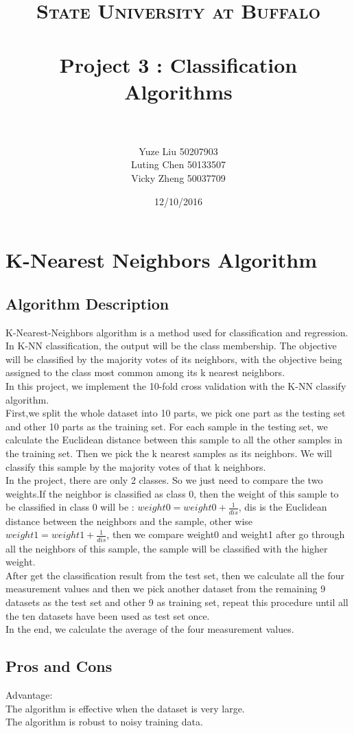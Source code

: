 \documentclass[paper=letter, fontsize=11pt]{article}
\title{
		\usefont{OT1}{bch}{b}{n}
		\normalfont \normalsize \textsc{State University at Buffalo} \\ [25pt]
		\horrule{0.5pt} \\[0.4cm]
		\Large Project 3 : Classification Algorithms \\
		\horrule{2pt} \\[0.5cm]
}
\author{
		\normalfont\large 								
        Yuze Liu \hspace{0.6cm}50207903\\
        \normalfont\large 
        Luting Chen \hspace{0.5cm}50133507\\
        \normalfont\large 
        Vicky Zheng \hspace{0.5cm}50037709\\
}
\date{\large 12/10/2016}
\numberwithin{equation}{section}		%
\numberwithin{figure}{section}			%
\numberwithin{table}{section}				%
\begin{document}
\maketitle
\section{K-Nearest Neighbors Algorithm}
\subsection{Algorithm Description}
K-Nearest-Neighbors algorithm is a method used for classification and regression. In K-NN classification, the output will be the class membership. The objective will be classified by the majority votes of its neighbors, with the objective being assigned to the class most common among its k nearest neighbors.\\
In this project, we implement the 10-fold cross validation with the K-NN classify algorithm.\\
First,we split the whole dataset into 10 parts, we pick one part as the testing set and other 10 parts as the training set. For each sample in the testing set, we calculate the Euclidean distance between this sample to all the other samples in the training set. Then we pick the k nearest samples as its neighbors. We will classify this sample by the majority votes of that k neighbors.\\
In the project, there are only 2 classes. So we just need to compare the two weights.If the neighbor is classified as class 0, then the weight of this sample to be classified in class 0 will be : $weight0 = weight0 + \frac{1}{dis}$, dis is the Euclidean distance between the neighbors and the sample, other wise $weight1 = weight1 + \frac{1}{dis}$, then we compare weight0 and weight1 after go through all the neighbors of this sample, the sample will be classified with the higher weight.\\
After get the classification result from the test set, then we calculate all the four measurement values and then we pick another dataset from the remaining 9 datasets as the test set and other 9 as training set, repeat this procedure until all the ten datasets have been used as test set once.\\
In the end, we calculate the average of the four measurement values.  

\subsection{Pros and Cons}
Advantage:\\
The algorithm is effective when the dataset is very large.\\
The algorithm is robust to noisy training data.\\
\end{document}
